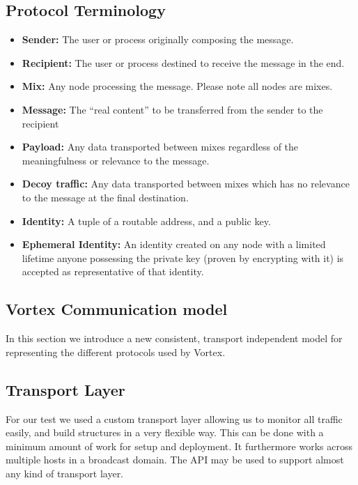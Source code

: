 \subsection{Protocol Terminology}

\begin{itemize}
	\item \textbf{Sender:} The user or process originally composing the message.
	\item \textbf{Recipient:} The user or process destined to receive the message in the end.
	\item \textbf{Mix:} Any node processing the message. Please note all nodes are mixes.
	\item \textbf{Message:} The ``real content'' to be transferred from the sender to the recipient
	\item \textbf{Payload:} Any data transported between mixes regardless of the meaningfulness or relevance to the message.
	\item \textbf{Decoy traffic:} Any data transported between mixes which has no relevance to the message at the final destination.
	\item \textbf{Identity:} A tuple of a routable address, and a public key.
	\item \textbf{Ephemeral Identity:} An identity created on any node with a limited lifetime anyone possessing the private key (proven by encrypting with it) is accepted as representative of that identity.
\end{itemize}



\subsection{Vortex Communication model}
In this section we introduce a new consistent, transport independent model for representing the different protocols used by Vortex.


\subsection{Transport Layer}
For our test we used a custom transport layer allowing us to monitor all traffic easily, and build structures in a very flexible way. This can be done with a minimum amount of work for setup  and deployment. It furthermore works across multiple hosts in a broadcast domain. The API may be used to support almost any kind of transport layer.

